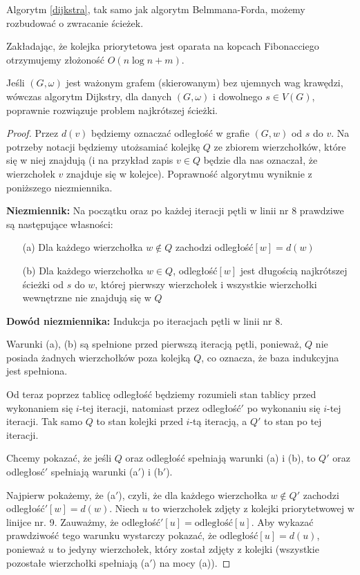 Algorytm \ref{dijkstra}, tak samo jak algorytm Belmmana-Forda,
możemy rozbudować o zwracanie ścieżek.

Zakładając, że kolejka priorytetowa jest oparata na kopcach 
Fibonacciego otrzymujemy złożoność $O(n\log n + m)$. 

\begin{theorem}
	Jeśli $(G, \omega)$ jest ważonym grafem (skierowanym)
	bez ujemnych wag krawędzi, wówczas algorytm Dijkstry,
	dla danych $(G, \omega)$ i dowolnego $s \in V(G)$, 
	poprawnie rozwiązuje problem najkrótszej ścieżki.
	
	\begin{proof}
		Przez $d(v)$ będziemy oznaczać odległość w 
		grafie $(G, w)$
		od $s$ do $v$. Na potrzeby notacji 
		będziemy utożsamiać
		kolejkę $Q$ ze zbiorem wierzchołków, które
		się w niej znajdują (i na przykład zapis $v \in Q$ 
		będzie dla nas oznaczał, że
		wierzchołek $v$ znajduje się w kolejce).
		Poprawność algorytmu wyniknie z poniższego niezmiennika.
		
		\textbf{Niezmiennik: } Na początku oraz po 
		każdej iteracji pętli w linii nr 8 prawdziwe są 
		następujące własności:
		\begin{itemize}
			\item[(a)] Dla każdego wierzchołka $w \not \in Q$
			zachodzi odległość$[w] = d(w)$ 
			\item[(b)] Dla każdego wierzchołka $w \in Q$,
			odległość$[w]$ jest długością najkrótszej
			ścieżki od $s$ do $w$, której pierwszy wierzchołek 
			i wszystkie wierzchołki wewnętrzne nie znajdują się 
			w $Q$ 
		\end{itemize}
		\textbf{Dowód niezmiennika: } Indukcja po iteracjach
		pętli w linii nr 8.
		
		Warunki (a), (b) są spełnione przed pierwszą iteracją
		pętli, ponieważ, $Q$
		nie posiada żadnych wierzchołków poza 
		kolejką $Q$, co oznacza, że baza indukcyjna jest spełniona.
		
		Od teraz poprzez tablicę odległość będziemy rozumieli 
		stan tablicy przed wykonaniem się $i$-tej iteracji, 
		natomiast przez odległość$'$ po wykonaniu się $i$-tej iteracji.
		Tak samo $Q$ to stan kolejki przed $i$-tą iteracją,
		a $Q'$ to stan po tej iteracji. 
		
		Chcemy pokazać, że jeśli $Q$ oraz odległość spełniają
		warunki (a) i (b), to $Q'$ oraz odległosć$'$ 
		spełniają warunki (a$'$) i (b$'$).
		
		Najpierw pokażemy, że (a$'$), czyli, że
		dla każdego wierzchołka $w \not \in Q'$ zachodzi
		odległość$'[w] = d(w)$. Niech $u$ to wierzchołek
		zdjęty z kolejki priorytetwowej w linijce nr. 9.
		Zauważmy, że odległość$'[u] = \text{odległość}[u]$. 
		Aby wykazać prawdziwość tego warunku wystarczy
		pokazać, że $\text{odległość}[u] = d(u)$, ponieważ
		$u$ to jedyny wierzchołek, który został zdjęty z kolejki
		(wszystkie pozostałe wierzchołki spełniają 
		(a$'$) na mocy (a)).
		

\end{proof}
\end{theorem}
